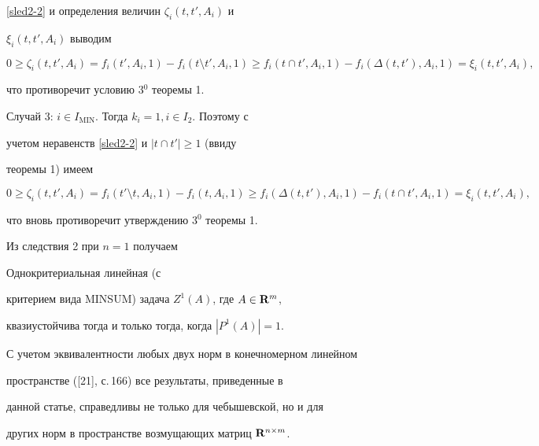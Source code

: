 \begin{pf}
\eqref{sled2-2} и определения величин $\zeta_i(t, t', A_i)$ и


$\xi_i(t, t', A_i)$ выводим


$$


0 \geq \zeta_i(t, t', A_i)= f_i( t', A_i, 1)-f_i( t \setminus t', A_i, 1)\geq


f_i(t \cap t', A_i, 1)-f_i( \Delta(t, t'), A_i, 1) = \xi_i(t, t', A_i),


$$


что противоречит условию 3$^0$ теоремы 1.





Случай 3: $i \in I_{\mathrm{MIN}}$. Тогда $k_i=1, i \in I_2$. Поэтому с


учетом неравенств \eqref{sled2-2} и $|t \cap t'|\geq 1$ (ввиду


теоремы 1) имеем


$$


0 \geq \zeta_i(t, t', A_i)= f_i( t' \setminus t, A_i, 1)-f_i( t, A_i, 1) \geq


f_i( \Delta(t, t'), A_i, 1)-f_i(t \cap t', A_i, 1) = \xi_i(t, t', A_i),


$$


что вновь противоречит утверждению 3$^0$ теоремы 1.


\end{pf}





Из следствия 2 при $n=1$ получаем





\begin{cor}


Однокритериальная линейная (с


критерием вида MINSUM) задача $Z^1(A)$, где $A\in\bold{R}^m$,


квазиустойчива тогда и только тогда, когда $|P^1(A)|=1$.


\end{cor}





\begin{note}


С учетом эквивалентности любых двух норм в конечномерном линейном


пространстве ([21], с.\,166) все результаты, приведенные в


данной статье, справедливы не только для чебышевской, но и для


других норм в пространстве возмущающих матриц $\bold{R}^{n\times


m}$.


\end{note}











